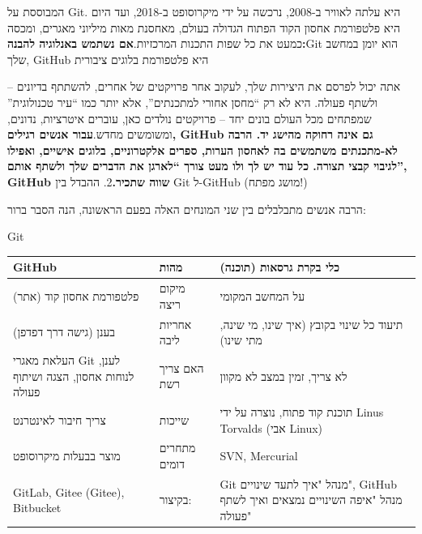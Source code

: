 


המבוססת על Git. היא עלתה לאוויר ב-2008, נרכשה על ידי מיקרוסופט ב-2018, ועד היום היא פלטפורמת אחסון הקוד הפתוח הגדולה בעולם, מאחסנת מאות מיליוני מאגרים, ומכסה כמעט את כל שפות התכנות המרכזיות.\textbf{אם נשתמש באנלוגיה להבנה:}Git הוא יומן במחשב שלך, GitHub היא פלטפורמת בלוגים ציבורית

– אתה יכול לפרסם את היצירות שלך, לעקוב אחר פרויקטים של אחרים, להשתתף בדיונים ולשתף פעולה. היא לא רק “מחסן אחורי למתכנתים”, אלא יותר כמו “עיר טכנולוגית” שמפתחים מכל העולם בונים יחד – פרויקטים נולדים כאן, עוברים איטרציות, נדונים, ומשומשים מחדש.\textbf{עבור אנשים רגילים, GitHub גם אינה רחוקה מהישג יד. הרבה לא-מתכנתים משתמשים בה לאחסון הערות, ספרים אלקטרוניים, בלוגים אישיים, ואפילו לגיבוי קבצי תצורה. כל עוד יש לך ולו מעט צורך “לארגן את הדברים שלך ולשתף אותם”, GitHub שווה שתכיר.}2. ההבדל בין Git ל-GitHub (מושג מפתח!)

הרבה אנשים מתבלבלים בין שני המונחים האלה בפעם הראשונה, הנה הסבר ברור:


Git

\begin{center}
\begin{tabularx}{\linewidth}{|X|X|X|}
\hline
\textbf{GitHub} & \textbf{מהות} & \textbf{כלי בקרת גרסאות (תוכנה)} \tabularnewline
\hline
פלטפורמת אחסון קוד (אתר) & מיקום ריצה & על המחשב המקומי \tabularnewline
בענן (גישה דרך דפדפן) & אחריות ליבה & תיעוד כל שינוי בקובץ (איך שינו, מי שינה, מתי שינו) \tabularnewline
העלאת מאגרי Git לענן, לנוחות אחסון, הצגה ושיתוף פעולה & האם צריך רשת & לא צריך, זמין במצב לא מקוון \tabularnewline
צריך חיבור לאינטרנט & שייכות & תוכנת קוד פתוח, נוצרה על ידי Linus Torvalds (אבי Linux) \tabularnewline
מוצר בבעלות מיקרוסופט & מתחרים דומים & SVN, Mercurial \tabularnewline
GitLab, Gitee (Gitee), Bitbucket & בקיצור: & Git מנהל "איך לתעד שינויים", GitHub מנהל "איפה השינויים נמצאים ואיך לשתף פעולה" \tabularnewline
\hline
\end{tabularx}
\end{center}


